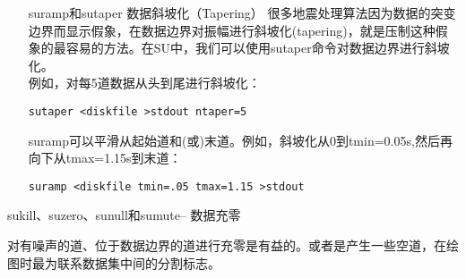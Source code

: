 \begin{enumerate}
	\item[suramp和sutaper] 数据斜坡化（Tapering）
	很多地震处理算法因为数据的突变边界而显示假象，在数据边界对振幅进行斜坡化(tapering)，就是压制这种假象的最容易的方法。在SU中，我们可以使用sutaper命令对数据边界进行斜坡化。\\
	例如，对每5道数据从头到尾进行斜坡化：
\begin{lstlisting}
sutaper <diskfile >stdout ntaper=5
\end{lstlisting}
	suramp可以平滑从起始道和(或)末道。例如，斜坡化从0到tmin=0.05s,然后再向下从tmax=1.15s到末道：
\begin{lstlisting}
suramp <diskfile tmin=.05 tmax=1.15 >stdout
\end{lstlisting}
	\end{enumerate}\par
	sukill、suzero、sunull和sumute– 数据充零\par
	对有噪声的道、位于数据边界的道进行充零是有益的。或者是产生一些空道，在绘图时最为联系数据集中间的分割标志。

